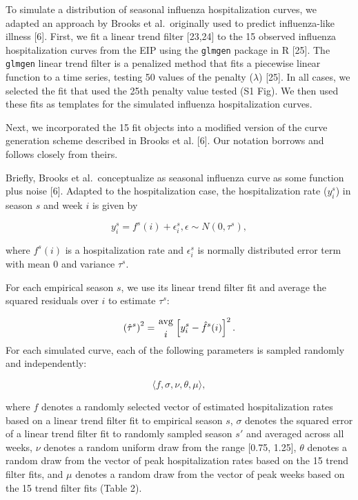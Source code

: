 \documentclass[10pt,letterpaper]{article}
\begin{document}
To simulate a distribution of seasonal influenza hospitalization curves,
we adapted an approach by Brooks et al.~originally used to predict
influenza-like illness {[}6{]}. First, we fit a linear trend filter
{[}23,24{]} to the 15 observed influenza hospitalization curves from the
EIP using the \texttt{glmgen} package in R {[}25{]}. The \texttt{glmgen}
linear trend filter is a penalized method that fits a piecewise linear
function to a time series, testing 50 values of the penalty
(\(\lambda\)) {[}25{]}. In all cases, we selected the fit that used the
25th penalty value tested (S1 Fig). We then used these fits as templates
for the simulated influenza hospitalization curves.

Next, we incorporated the 15 fit objects into a modified version of the
curve generation scheme described in Brooks et al. {[}6{]}. Our notation
borrows and follows closely from theirs.

Briefly, Brooks et al.~conceptualize as seasonal influenza curve as some
function plus noise {[}6{]}. Adapted to the hospitalization case, the
hospitalization rate (\(y^s_i\)) in season \(s\) and week \(i\) is given
by

\[y^s_i = f^s(i) + \epsilon^s_i, \epsilon \sim N(0, \tau^s),\]

where \(f^s(i)\) is a hospitalization rate and \(\epsilon^s_i\) is
normally distributed error term with mean 0 and variance \(\tau^s\).

For each empirical season \(s\), we use its linear trend filter fit and
average the squared residuals over \(i\) to estimate \(\tau^s\):

\[\left( \hat{\tau}^s \right)^2 = \genfrac{}{}{0pt}{}{\text{avg}}{i} \left[ y^s_i - \hat{f}^s (i) \right]^2.\]
For each simulated curve, each of the following parameters is sampled
randomly and independently:

\[\langle f, \sigma, \nu, \theta, \mu \rangle,\]

where \(f\) denotes a randomly selected vector of estimated
hospitalization rates based on a linear trend filter fit to empirical
season \(s\), \(\sigma\) denotes the squared error of a linear trend
filter fit to randomly sampled season \(s'\) and averaged across all
weeks, \(\nu\) denotes a random uniform draw from the range {[}0.75,
1.25{]}, \(\theta\) denotes a random draw from the vector of peak
hospitalization rates based on the 15 trend filter fits, and \(\mu\)
denotes a random draw from the vector of peak weeks based on the 15
trend filter fits (Table 2).
\end{document}
